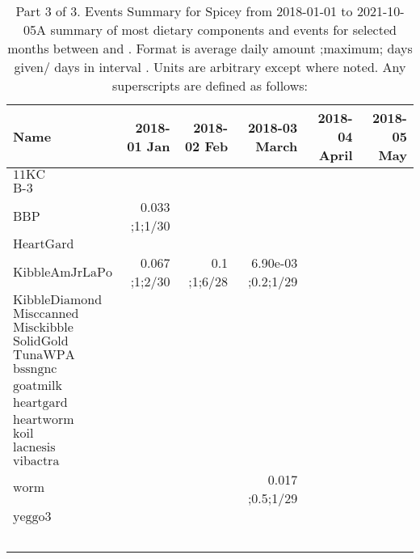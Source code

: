 \begin{table}[H]
\centering
\begin{tabular}{|l|r|r|r|r|r|}
\hline
Name&2018-01 Jan&2018-02 Feb&2018-03 March&2018-04 April&2018-05 May\\
\hline
$\textrm{11KC}$&&&&&\\
$\textrm{B-3}$&&&&&\\
$\textrm{BBP}$&0.033 ;1;1/30&&&&\\
$\textrm{HeartGard}$&&&&&\\
$\textrm{KibbleAmJrLaPo}$&0.067 ;1;2/30&0.1 ;1;6/28&6.90e-03 ;0.2;1/29&&\\
$\textrm{KibbleDiamond}$&&&&&\\
$\textrm{Misccanned}$&&&&&\\
$\textrm{Misckibble}$&&&&&\\
$\textrm{SolidGold}$&&&&&\\
$\textrm{TunaWPA}$&&&&&\\
$\textrm{bssngnc}$&&&&&\\
$\textrm{goatmilk}$&&&&&\\
$\textrm{heartgard}$&&&&&\\
$\textrm{heartworm}$&&&&&\\
$\textrm{koil}$&&&&&\\
$\textrm{lacnesis}$&&&&&\\
$\textrm{vibactra}$&&&&&\\
$\textrm{worm}$&&&0.017 ;0.5;1/29&&\\
$\textrm{yeggo3}$&&&&&\\
&&&&&\\
&&&&&\\
&&&&&\\
&&&&&\\
&&&&&\\
\hline
\end{tabular}
\caption{Part 3 of 3.  Events Summary for Spicey   from 2018-01-01 to 2021-10-05A summary of most dietary components and events  for selected months between \mjmdatemin and \mjmdatemax. Format is average daily amount ;maximum; days given/ days in interval . Units are arbitrary except where noted. Any  superscripts are defined as follows:  \mjmsuperscripts}
\end{table}
